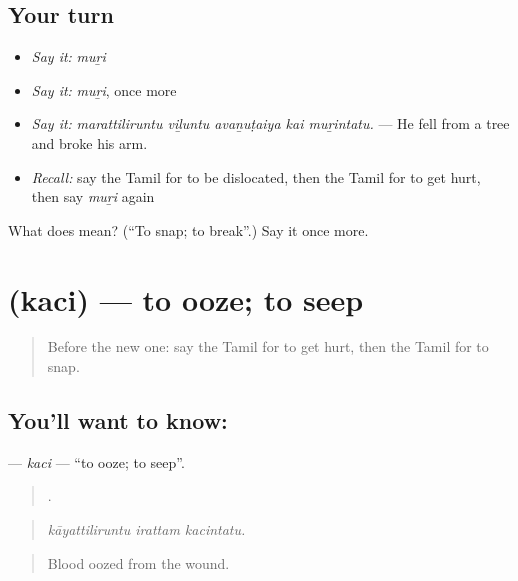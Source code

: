 \subsection*{Your turn}
\begin{itemize}
\raggedright
  \item \emph{Say it:} \emph{muṟi}
  \item \emph{Say it:} \emph{muṟi}, once more
  \item \emph{Say it:} \emph{marattiliruntu viḻuntu avaṉuṭaiya kai muṟintatu.} — He fell from a tree and broke his arm.
  \item \emph{Recall:} say the Tamil for to be dislocated, then the Tamil for to get hurt, then say \emph{muṟi} again
\end{itemize}

\begin{tcolorbox}[breakable,colback=teal!4,colframe=teal!35!black,title={Before you move on}]
What does  mean? (\textquotedblleft{}To snap; to break\textquotedblright{}.) Say it once more.
\end{tcolorbox}
\section[\texorpdfstring{\ta{கசி} (kaci)}{கசி (kaci)}]{ (kaci) — to ooze; to seep}

\label{lesson:TA-C482-kaci}



\begin{quote}
Before the new one: say the Tamil for to get hurt, then the Tamil for to snap.
\end{quote}

\subsection*{You'll want to know: }
\textbf{} — \emph{kaci} — \textquotedblleft{}to ooze; to seep\textquotedblright{}.

\begin{quote}
  .
\end{quote}

\begin{quote}
\emph{kāyattiliruntu irattam kacintatu.}
\end{quote}

\begin{quote}
Blood oozed from the wound.
\end{quote}

